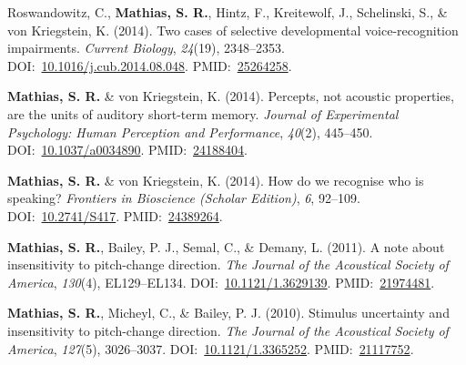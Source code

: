 \documentclass[10pt]{article}
\makeatletter
\newlength{\bibhang}
\newlength{\bibsep}
 {\@listi \global\bibsep\itemsep \global\advance\bibsep by\parsep}
\newenvironment{bibsection}%
        {\vspace{-\baselineskip}\begin{list}{}{%
       \setlength{\leftmargin}{\bibhang}%
       \setlength{\itemindent}{-\leftmargin}%
       \setlength{\itemsep}{\bibsep}%
       \setlength{\parsep}{\z@}%
        \setlength{\partopsep}{0pt}%
        \setlength{\topsep}{0pt}}}
        {\end{list}\vspace{-.6\baselineskip}}
\makeatother
\begin{document}
\begin{bibsection}
\item Roswandowitz, C., \textbf{Mathias, S. R.}, Hintz, F., Kreitewolf, J., Schelinski, S., \& von Kriegstein, K. (2014). Two cases of selective developmental voice-recognition impairments. \emph{Current Biology}, \emph{24}(19), 2348--2353. DOI:~\href{https://doi.org/10.1016/j.cub.2014.08.048}{10.1016/j.cub.2014.08.048}. PMID:~\href{https://www.ncbi.nlm.nih.gov/pubmed/?term=25264258}{25264258}.
\item \textbf{Mathias, S. R.} \& von Kriegstein, K. (2014). Percepts, not acoustic properties, are the units of auditory short-term memory. \emph{Journal of Experimental Psychology: Human Perception and Performance}, \emph{40}(2), 445--450. DOI:~\href{https://doi.org/10.1037/a0034890}{10.1037/a0034890}. PMID:~\href{https://www.ncbi.nlm.nih.gov/pubmed/?term=24188404}{24188404}.
\item \textbf{Mathias, S. R.} \& von Kriegstein, K. (2014). How do we recognise who is speaking? \emph{Frontiers in Bioscience (Scholar Edition)}, \emph{6}, 92--109. DOI:~\href{https://doi.org/10.2741/S417}{10.2741/S417}. PMID:~\href{https://www.ncbi.nlm.nih.gov/pubmed/?term=24389264}{24389264}.
\item \textbf{Mathias, S. R.}, Bailey, P. J., Semal, C., \& Demany, L. (2011). A note about insensitivity to pitch-change direction. \emph{The Journal of the Acoustical Society of America}, \emph{130}(4), EL129--EL134. DOI:~\href{https://doi.org/10.1121/1.3629139}{10.1121/1.3629139}. PMID:~\href{https://www.ncbi.nlm.nih.gov/pubmed/?term=21974481}{21974481}.
\item \textbf{Mathias, S. R.}, Micheyl, C., \& Bailey, P. J. (2010). Stimulus uncertainty and insensitivity to pitch-change direction. \emph{The Journal of the Acoustical Society of America}, \emph{127}(5), 3026--3037. DOI:~\href{https://doi.org/10.1121/1.3365252}{10.1121/1.3365252}. PMID:~\href{https://www.ncbi.nlm.nih.gov/pubmed/?term=21117752}{21117752}.



\end{bibsection}
\end{document}

